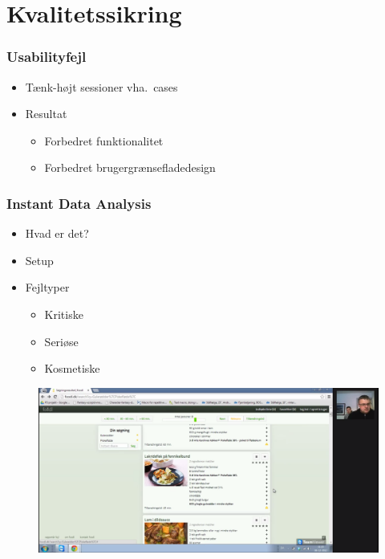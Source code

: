 \section{Kvalitetssikring}

\begin{frame}
	\frametitle{Usabilityfejl}
  \begin{itemize}
    \item Tænk-højt sessioner vha.\ cases
    \item Resultat
    \begin{itemize}
      \item Forbedret funktionalitet
      \item Forbedret brugergrænsefladedesign
    \end{itemize}
  \end{itemize}
\end{frame}

\begin{frame}
	\frametitle{Instant Data Analysis}
  \begin{itemize}
    \item Hvad er det?
	  \item Setup
    \item Fejltyper
      \begin{itemize}
        \item Kritiske
        \item Seriøse
        \item Kosmetiske
      \end{itemize}
  \end{itemize}
\end{frame}

\begin{frame}[fragile]
  \begin{figure}
  \includegraphics[width=\textwidth]{billeder/keldIDA.png}
  \end{figure}
\end{frame}

